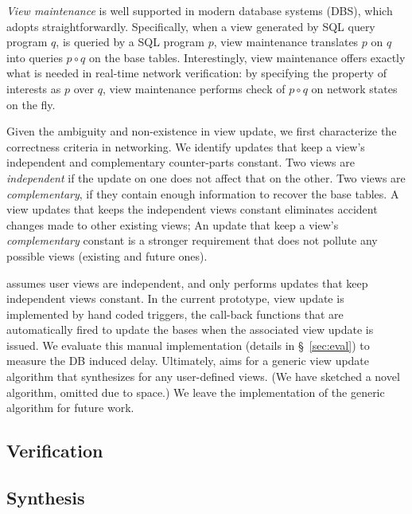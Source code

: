 \textit{View maintenance} is well supported in modern database systems
(DBS), which \Sys adopts straightforwardly. Specifically, when a view
generated by SQL query program $q$, is queried by a SQL program $p$,
view maintenance translates $p$ on $q$ into queries $p \circ q$ on the
base tables.
Interestingly, view maintenance offers exactly what is needed in
real-time network verification: by specifying the property of interests
as $p$ over $q$, view maintenance performs check of $p \circ q$ on
network states on the fly. %

Given the ambiguity and non-existence in view update, we first
characterize the correctness criteria in networking. We identify
updates that keep a view's independent and complementary counter-parts
constant. Two views are \textit{independent} if the update on one does
not affect that on the other. Two views are \textit{complementary}, if
they contain enough information to recover the base tables.
A view updates that keeps the independent views constant eliminates
accident changes made to other existing views; An update that keep a
view's \textit{complementary} constant is a stronger requirement that
does not pollute any possible views (existing and future ones).

\Sys assumes user views are independent, and only performs updates
that keep independent views constant.  In the current prototype, view
update is implemented by hand coded triggers, the call-back functions
that are automatically fired to update the bases when the associated
view update is issued. We evaluate this manual implementation (details
in \S~\ref{sec:eval}) to measure the DB induced delay.
Ultimately, \Sys aims for a generic view update algorithm that
synthesizes for any user-defined views. (We have sketched a novel
algorithm, omitted due to space.) We leave the implementation of the
generic algorithm for future work.

% 


\subsection{Verification}

\subsection{Synthesis}


